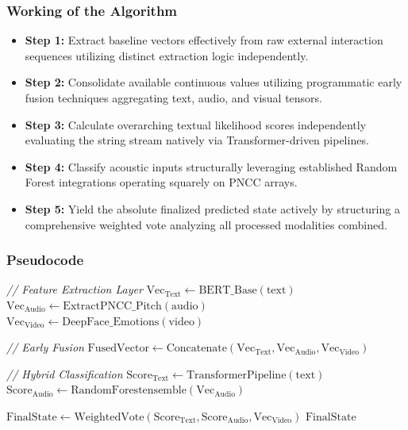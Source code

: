 \documentclass[11pt]{report}
\begin{document}
\subsubsection*{Working of the Algorithm}
\begin{itemize}
    \item \textbf{Step 1:} Extract baseline vectors effectively from raw external interaction sequences utilizing distinct extraction logic independently.
    \item \textbf{Step 2:} Consolidate available continuous values utilizing programmatic early fusion techniques aggregating text, audio, and visual tensors.
    \item \textbf{Step 3:} Calculate overarching textual likelihood scores independently evaluating the string stream natively via Transformer-driven pipelines.
    \item \textbf{Step 4:} Classify acoustic inputs structurally leveraging established Random Forest integrations operating squarely on PNCC arrays.
    \item \textbf{Step 5:} Yield the absolute finalized predicted state actively by structuring a comprehensive weighted vote analyzing all processed modalities combined.
\end{itemize}

\subsubsection*{Pseudocode}
\begin{algorithm}[H]
\caption{Hybrid Classification Algorithm}
\label{alg:hybrid_classification}
\begin{algorithmic}[1]
    \State \textit{// Feature Extraction Layer}
    \State $\mathrm{Vec}_{\mathrm{Text}} \gets \mathrm{BERT\_Base}(\mathrm{text})$ 
    \State $\mathrm{Vec}_{\mathrm{Audio}} \gets \mathrm{ExtractPNCC\_Pitch}(\mathrm{audio})$ 
    \State $\mathrm{Vec}_{\mathrm{Video}} \gets \mathrm{DeepFace\_Emotions}(\mathrm{video})$ 
    
    \State \textit{// Early Fusion}
    \State $\mathrm{FusedVector} \gets \mathrm{Concatenate}(\mathrm{Vec}_{\mathrm{Text}}, \mathrm{Vec}_{\mathrm{Audio}}, \mathrm{Vec}_{\mathrm{Video}})$
    
    \State \textit{// Hybrid Classification}
    \State $\mathrm{Score}_{\mathrm{Text}} \gets \mathrm{TransformerPipeline}(\mathrm{text})$
    \State $\mathrm{Score}_{\mathrm{Audio}} \gets \mathrm{RandomForestensemble}(\mathrm{Vec}_{\mathrm{Audio}})$
    
    \State $\mathrm{FinalState} \gets \mathrm{WeightedVote}(\mathrm{Score}_{\mathrm{Text}}, \mathrm{Score}_{\mathrm{Audio}}, \mathrm{Vec}_{\mathrm{Video}})$
    \State \Return $\mathrm{FinalState}$
\EndProcedure
\end{algorithmic}
\end{algorithm}
\end{document}
